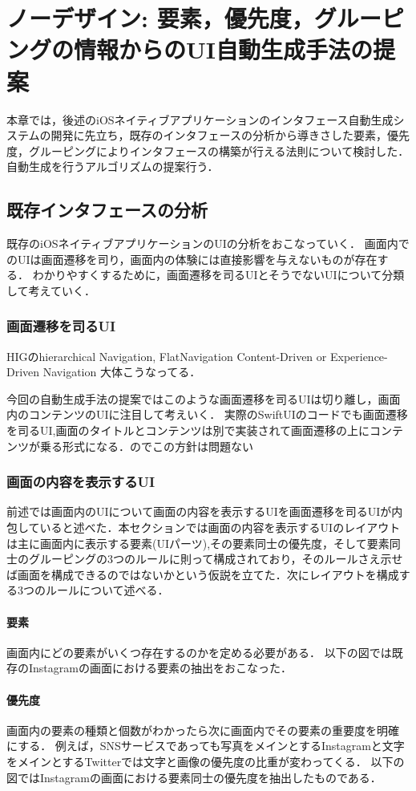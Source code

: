\chapter{ノーデザイン: 要素，優先度，グルーピングの情報からのUI自動生成手法の提案}
\label{chap:auto-gen}

本章では，後述のiOSネイティブアプリケーションのインタフェース自動生成システムの開発に先立ち，既存のインタフェースの分析から導きさした要素，優先度，グルーピングによりインタフェースの構築が行える法則について検討した．自動生成を行うアルゴリズムの提案行う．
\section{既存インタフェースの分析}
既存のiOSネイティブアプリケーションのUIの分析をおこなっていく．
画面内でのUIは画面遷移を司り，画面内の体験には直接影響を与えないものが存在する．
わかりやすくするために，画面遷移を司るUIとそうでないUIについて分類して考えていく．
\subsection{画面遷移を司るUI}
HIGのhierarchical Navigation,
FlatNavigation
Content-Driven or Experience-Driven Navigation
大体こうなってる．


今回の自動生成手法の提案ではこのような画面遷移を司るUIは切り離し，画面内のコンテンツのUIに注目して考えいく．
実際のSwiftUIのコードでも画面遷移を司るUI,画面のタイトルとコンテンツは別で実装されて画面遷移の上にコンテンツが乗る形式になる．のでこの方針は問題ない


\subsection{画面の内容を表示するUI}
前述では画面内のUIについて画面の内容を表示するUIを画面遷移を司るUIが内包していると述べた．本セクションでは画面の内容を表示するUIのレイアウトは主に画面内に表示する要素(UIパーツ),その要素同士の優先度，そして要素同士のグルーピングの3つのルールに則って構成されており，そのルールさえ示せば画面を構成できるのではないかという仮説を立てた．次にレイアウトを構成する3つのルールについて述べる．
\subsubsection{要素}
画面内にどの要素がいくつ存在するのかを定める必要がある．
以下の図では既存のInstagramの画面における要素の抽出をおこなった．
\subsubsection{優先度}
画面内の要素の種類と個数がわかったら次に画面内でその要素の重要度を明確にする．
例えば，SNSサービスであっても写真をメインとするInstagramと文字をメインとするTwitterでは文字と画像の優先度の比重が変わってくる．
以下の図ではInstagramの画面における要素同士の優先度を抽出したものである．

